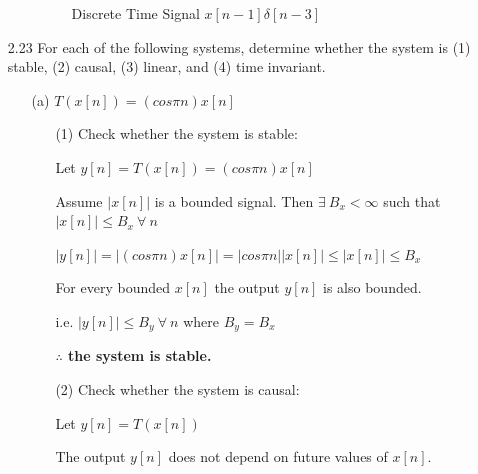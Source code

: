 \documentclass[fleqn]{article}
\begin{document}
\begin{enumerate}[nolistsep]
\begin{enumerate}[nolistsep]
		\renewcommand{\thefigure}{P2.21-E-3}
		
		\begin{figure}[H]
			\centerline{}
		\caption{Discrete Time Signal $x[n-1]\delta[n-3]$}
		\label{part_e}
		\end{figure}
		
		\end{enumerate}
		
		\item[2.23] For each of the following systems, determine whether the system is (1) stable, (2) causal, (3) linear, and (4) time invariant.
		
		\begin{enumerate}[nolistsep]
			\item[(a)] $T(x[n]) = (cos{\pi}n)x[n]$
			
				\begin{enumerate}[nolistsep]
				
					\item[(1)] Check whether the system is stable:
			
					Let $y[n] = T(x[n]) = (cos{\pi}n)x[n]$
			
					Assume $|x[n]|$ is a bounded signal. Then $\exists\ B_x < \infty$ such that  $|x[n]| \leq B_x\ \forall\ n$
			
					$|y[n]| = |(cos{\pi}n)x[n]| = |cos{\pi}n||x[n]| \leq |x[n]| \leq B_x$
			
					For every bounded $x[n]$ the output $y[n]$ is also bounded.
					
					i.e. $|y[n]| \leq B_y\ \forall\ n$ where $B_y = B_x$					
			
					\textbf{$\mathbf{\therefore}$ the system is stable.}
					
					\item[(2)] Check whether the system is causal:
					
					Let $y[n] = T(x[n])$
					
					The output $y[n]$ does not depend on future values of $x[n]$.
					

\end{enumerate}
\end{enumerate}
\end{enumerate}
\end{document}

